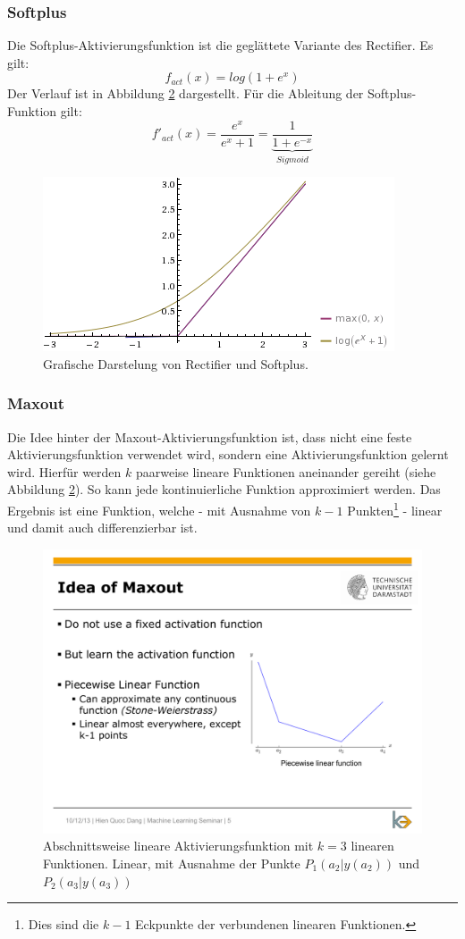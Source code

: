 \subsubsection*{Softplus}
Die Softplus-Aktivierungsfunktion ist die geglättete Variante des Rectifier. Es gilt:
\[
	f_{act}(x) = log(1 + e^x)
\]
Der Verlauf ist in Abbildung \ref{fig:ch01_fact-softplus} dargestellt. Für die Ableitung der Softplus-Funktion gilt:
\[
	f'_{act}(x) = \frac{e^x}{e^x + 1} = 
		\underbrace{\frac{1}{1 + e^{-x}}}_{Sigmoid}
\]

\begin{figure}[ht!] \centering 
	\includegraphics[width=\linewidth]{figures/ch01_fact-softplus.png}
	\caption{Grafische Darstelung von Rectifier und Softplus.}
	\label{fig:ch01_fact-softplus}
\end{figure}

\subsubsection*{Maxout}
Die Idee hinter der Maxout-Aktivierungsfunktion ist, dass nicht eine feste Aktivierungsfunktion verwendet wird, sondern eine Aktivierungsfunktion gelernt wird.
Hierfür werden $k$ paarweise lineare Funktionen aneinander gereiht (siehe Abbildung \ref{fig:ch01_fact-softplus}). So kann jede kontinuierliche Funktion approximiert werden. Das Ergebnis ist eine Funktion, welche - mit Ausnahme von $k-1$ Punkten\footnote{Dies sind die $k-1$ Eckpunkte der verbundenen linearen Funktionen.} - linear und damit auch differenzierbar ist.

\begin{figure}[ht!] \centering 
	\includegraphics[width=0.7\linewidth]{figures/ch01_maxout-paarweise-lineare-fkt.pdf}
	\caption{Abschnittsweise lineare Aktivierungsfunktion mit $k=3$ linearen Funktionen. Linear, mit Ausnahme der Punkte $P_1(a_2|y(a_2))$ und $P_2(a_3|y(a_3))$}
	\label{fig:ch01_fact-softplus}
\end{figure}

